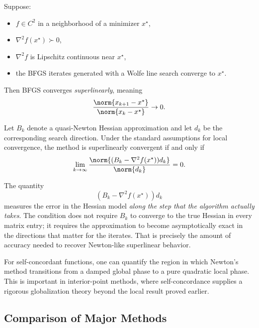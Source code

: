 \begin{theorem}\label{thm:l2-superlinear-convergence-of-bfgs}
	Suppose:
	\begin{itemize}
		\item $f \in C^2$ in a neighborhood of a minimizer $x^\star$,
		\item $\nabla^2 f(x^\star)\succ 0$,
		\item $\nabla^2 f$ is Lipschitz continuous near $x^\star$,
		\item the BFGS iterates generated with a Wolfe line search converge to $x^\star$.
	\end{itemize}
	Then BFGS converges \emph{superlinearly}, meaning
	\[
		\frac{\norm{x_{k+1}-x^\star}}{\norm{x_k-x^\star}} \to 0.
	\]
\end{theorem}

\begin{theorem}\label{thm:l2-dennis-more-condition}
	Let $B_k$ denote a quasi-Newton Hessian approximation and let $d_k$ be the corresponding search direction. Under the standard assumptions for local convergence, the method is superlinearly convergent if and only if
	\[
		\lim_{k\to\infty}
		\frac{\norm{(B_k-\nabla^2 f(x^\star))d_k}}{\norm{d_k}}
		=0.
	\]
\end{theorem}

\begin{remark}
	The quantity
	\[
		(B_k-\nabla^2 f(x^\star))d_k
	\]
	measures the error in the Hessian model \emph{along the step that the algorithm actually takes}. The condition does not require $B_k$ to converge to the true Hessian in every matrix entry; it requires the approximation to become asymptotically exact in the directions that matter for the iterates. That is precisely the amount of accuracy needed to recover Newton-like superlinear behavior.
\end{remark}

\begin{remark}
	For self-concordant functions, one can quantify the region in which Newton's method transitions from a damped global phase to a pure quadratic local phase. This is important in interior-point methods, where self-concordance supplies a rigorous globalization theory beyond the local result proved earlier.
\end{remark}

\subsection{Comparison of Major Methods}
\label{sec:l2-comparison-of-major-methods}

